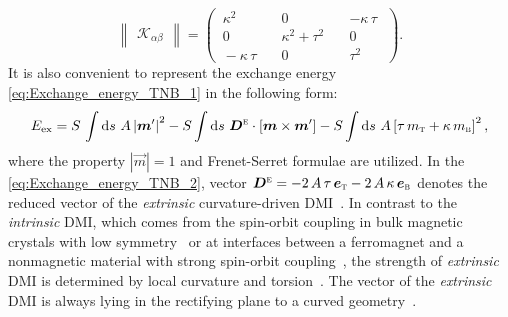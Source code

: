 \begin{equation} \label{eq:K_tensor_exchange}
\begin{Vmatrix} \mathcal{K}_{\alpha \beta} \end{Vmatrix} = \left(\begin{matrix*}  \, \kappa^2 \quad	& 0 \quad & - \kappa \, \tau \, \,  \\
\, 0 \quad & \kappa^2 + \tau^2 \quad & 0 \, \,  \\
\, - \kappa \, \tau \quad & 0 \quad &	\tau^2 \, \, 
\end{matrix*}\right).
\end{equation}
It is also convenient to represent the exchange energy \eqref{eq:Exchange_energy_TNB_1} in the following form:
\begin{equation} \label{eq:Exchange_energy_TNB_2}
E_{\textrm{ex}} =  S \, \int \textrm{d} s \, \, A \left| \vec{m}' \right|^2 - S \int \textrm{d} s \, \, \vec{D}^{\scriptsize \textsc{e}} \cdot [\vec{m} \times \vec{m}'] - S \int \textrm{d} s \, \, A \left[ \tau \, m_{\scriptsize \textsc{t}}  + \kappa \, m_{\scriptsize \textsc{b}} \right]^2, 
\end{equation}
where the property $|\vec{m}|=1$ and Frenet-Serret formulae are utilized. In the \eqref{eq:Exchange_energy_TNB_2}, vector $\vec{D}^{\scriptsize \textsc{e}} = - 2 \, A \, \tau \, \vec{e}_{\scriptsize \textsc{t}} - 2 \, A \, \kappa \, \vec{e}_{\scriptsize \textsc{b}}$ denotes the reduced vector of the \textit{extrinsic} curvature-driven DMI~\cite{Gaididei14,Sheka15,Sheka15c}.	In contrast to the \textit{intrinsic} DMI, which comes from the spin-orbit coupling in bulk magnetic crystals with low symmetry~\cite{Dzyaloshinsky58,Moriya60a} or at interfaces between a ferromagnet and a nonmagnetic material with strong spin-orbit coupling~\cite{Fert90,Crepieux98,Bode07,Yang15}, the strength of \textit{extrinsic} DMI is determined by local curvature and torsion~\cite{Pylypovskyi16,Volkov19c}. The vector of the \textit{extrinsic} DMI is always lying in the rectifying plane to a curved geometry~\cite{Volkov18}.

